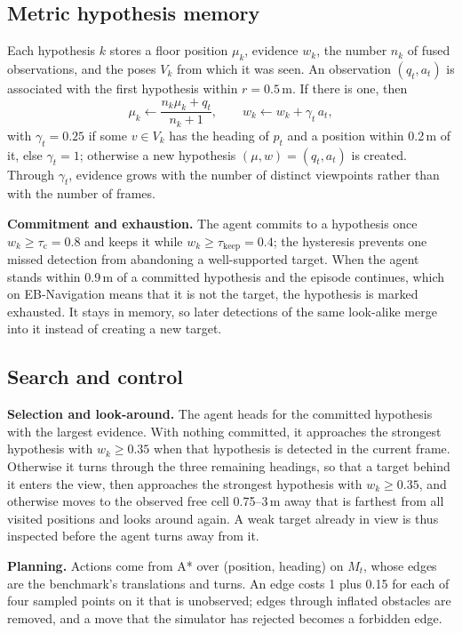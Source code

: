 \subsection{Metric hypothesis memory}
Each hypothesis $k$ stores a floor position $\mu_k$, evidence $w_k$, the number $n_k$ of fused observations, and
the poses $V_k$ from which it was seen. An
observation $(q_t,a_t)$ is associated with the first hypothesis within \mbox{$r=0.5$\,m}. If there is one, then
\begin{equation}
\mu_k\leftarrow\frac{n_k\mu_k+q_t}{n_k+1},\qquad w_k\leftarrow w_k+\gamma_t\,a_t ,
\label{eq:fuse}
\end{equation}
with $\gamma_t=0.25$ if some $v\in V_k$ has the heading of $p_t$ and a
position within 0.2\,m of it, else $\gamma_t=1$; otherwise a new hypothesis $(\mu,w)=(q_t,a_t)$ is created. Through $\gamma_t$, evidence grows with the number
of distinct viewpoints rather than with the number of frames.

\noindent\textbf{Commitment and exhaustion.}
The agent commits to a hypothesis once $w_k\ge\tau_\mathrm{c}=0.8$ and keeps it while $w_k\ge\tau_\mathrm{keep}=0.4$; the hysteresis
prevents one missed detection from abandoning a well-supported target. When the agent stands within 0.9\,m of a
committed hypothesis and the episode continues, which on EB-Navigation means that it is not the target, the
hypothesis is marked exhausted. It stays in memory, so later detections of the same look-alike merge into it
instead of creating a new target.

\subsection{Search and control}
\noindent\textbf{Selection and look-around.}
The agent heads for the committed hypothesis with the largest evidence. With nothing committed, it approaches the
strongest hypothesis with $w_k\ge0.35$ when that hypothesis is detected in the current frame. Otherwise it turns
through the three remaining headings, so that a target behind it enters the view, then approaches the strongest
hypothesis with $w_k\ge0.35$, and otherwise moves to the observed free cell 0.75--3\,m away that is farthest from
all visited positions and looks around again. A weak target already in view is thus inspected before the agent
turns away from it.

\noindent\textbf{Planning.}
Actions come from A* over (position, heading) on $M_t$, whose edges are the benchmark's translations and turns.
An edge costs 1 plus 0.15 for each of four sampled points on it that is unobserved; edges through inflated
obstacles are removed, and a move that the simulator has rejected becomes a forbidden edge.

